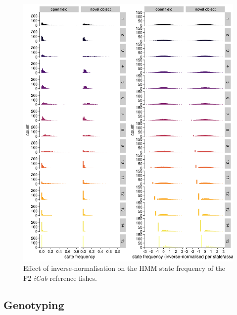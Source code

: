 \documentclass[
]{book}
\begin{document}
\begin{figure}
\includegraphics[width=1\linewidth]{figs/mikk_behaviour/0.08_15_state_freq_F2_sge} \caption{Effect of inverse-normalisation on the HMM state frequency of the F2 \emph{\textcolor{iCab_424B4D}{iCab}} reference fishes.}\label{fig:F2-state-freq-sge}
\end{figure}

\hypertarget{genotyping}{%
\subsection{Genotyping}\label{genotyping}}
\end{document}
